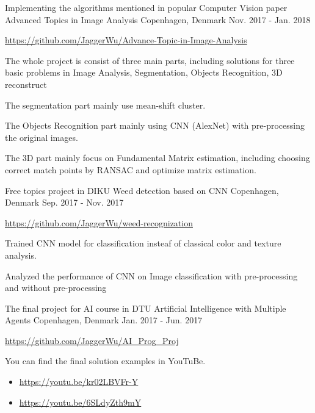 \begin{cventries}
  \cventry
    {Implementing the algorithms mentioned in popular Computer Vision paper}
    {Advanced Topics in Image Analysis}
    {Copenhagen, Denmark}
    {Nov. 2017 - Jan. 2018}
    {
      \begin{cvitems}
        \item {\url{https://github.com/JaggerWu/Advance-Topic-in-Image-Analysis}}
        \item {The whole project is consist of three main parts, including solutions for three basic problems in Image Analysis, Segmentation, Objects Recognition, 3D reconstruct}
        \item {The segmentation part mainly use mean-shift cluster.}
        \item {The Objects Recognition part mainly using CNN (AlexNet) with pre-processing the original images.}
        \item {The 3D part mainly focus on Fundamental Matrix estimation, including choosing correct match points by RANSAC and optimize matrix estimation.}
      \end{cvitems}
    }
  \cventry
    {Free topics project in DIKU}
    {Weed detection based on CNN}
    {Copenhagen, Denmark}
    {Sep. 2017 - Nov. 2017}
    {
      \begin{cvitems}
        \item {\url{https://github.com/JaggerWu/weed-recognization}}
        \item {Trained CNN model for classification insteaf of classical color and texture analysis. }
        \item {Analyzed the performance of CNN on Image classification with pre-processing and without pre-processing }
      \end{cvitems}
    }
  \cventry
    {The final project for AI course in DTU}
    {Artificial Intelligence with Multiple Agents}
    {Copenhagen, Denmark}
    {Jan. 2017 - Jun. 2017}
    {
      \begin{cvitems}
        \item {\url{https://github.com/JaggerWu/AI_Prog_Proj}}
        \item {You can find the final solution examples in YouTuBe.
        \begin{itemize}
            \item \url{https://youtu.be/kr02LBVFr-Y}
            \item \url{https://youtu.be/6SLdyZth9mY}
        \end{itemize}}

\end{cvitems}}
\end{cventries}
